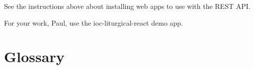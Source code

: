 \documentclass[]{memoir}
\begin{document}
See the instructions above about installing web apps to use with the REST API.

For your work, Paul, use the ioc-liturgical-react demo app.

\vfill



\fancyhead[L]{\textsf{\rightmark}} %
\fancyhead[R]{\textsf{\leftmark}} %
\renewcommand{\headrulewidth}{1.4pt} %
\fancyfoot[C]{\textbf{\textsf{\thepage}}} %
\renewcommand{\footrulewidth}{1.4pt} %
\pagestyle{fancy} %

\newcommand{\entry}[4]{\markboth{#1}{#1}\textbf{#1}\ {(#2)}\ \textit{#3}\ $\bullet$\ {#4}}  %

\setlength{\parskip}{5pt}\chapter{Glossary}
\end{document}
